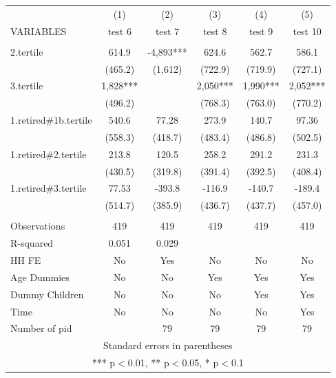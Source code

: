 \begin{tabular}{lccccc} \hline
 & (1) & (2) & (3) & (4) & (5) \\
VARIABLES & test 6 & test 7 & test 8 & test 9 & test 10 \\ \hline
 &  &  &  &  &  \\
2.tertile & 614.9 & -4,893*** & 624.6 & 562.7 & 586.1 \\
 & (465.2) & (1,612) & (722.9) & (719.9) & (727.1) \\
3.tertile & 1,828*** &  & 2,050*** & 1,990*** & 2,052*** \\
 & (496.2) &  & (768.3) & (763.0) & (770.2) \\
1.retired\#1b.tertile & 540.6 & 77.28 & 273.9 & 140.7 & 97.36 \\
 & (558.3) & (418.7) & (483.4) & (486.8) & (502.5) \\
1.retired\#2.tertile & 213.8 & 120.5 & 258.2 & 291.2 & 231.3 \\
 & (430.5) & (319.8) & (391.4) & (392.5) & (408.4) \\
1.retired\#3.tertile & 77.53 & -393.8 & -116.9 & -140.7 & -189.4 \\
 & (514.7) & (385.9) & (436.7) & (437.7) & (457.0) \\
 &  &  &  &  &  \\
Observations & 419 & 419 & 419 & 419 & 419 \\
R-squared & 0.051 & 0.029 &  &  &  \\
HH FE & No & Yes & No & No & No \\
Age Dummies & No & No & Yes & Yes & Yes \\
Dummy Children & No & No & No & Yes & Yes \\
Time & No & No & No & No & Yes \\
 Number of pid &  & 79 & 79 & 79 & 79 \\ \hline
\multicolumn{6}{c}{ Standard errors in parentheses} \\
\multicolumn{6}{c}{ *** p$<$0.01, ** p$<$0.05, * p$<$0.1} \\
\end{tabular}
